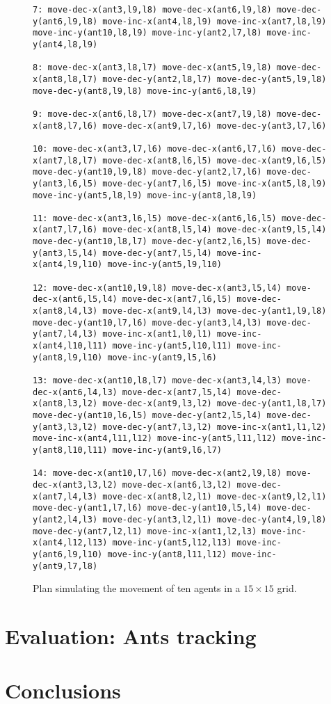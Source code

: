 \documentclass[letterpaper]{article} %
\begin{document}
\begin{figure}
\begin{scriptsize}
\begin{verbatim}
7: move-dec-x(ant3,l9,l8) move-dec-x(ant6,l9,l8) move-dec-y(ant6,l9,l8) move-inc-x(ant4,l8,l9) move-inc-x(ant7,l8,l9) move-inc-y(ant10,l8,l9) move-inc-y(ant2,l7,l8) move-inc-y(ant4,l8,l9)

8: move-dec-x(ant3,l8,l7) move-dec-x(ant5,l9,l8) move-dec-x(ant8,l8,l7) move-dec-y(ant2,l8,l7) move-dec-y(ant5,l9,l8) move-dec-y(ant8,l9,l8) move-inc-y(ant6,l8,l9)

9: move-dec-x(ant6,l8,l7) move-dec-x(ant7,l9,l8) move-dec-x(ant8,l7,l6) move-dec-x(ant9,l7,l6) move-dec-y(ant3,l7,l6)

10: move-dec-x(ant3,l7,l6) move-dec-x(ant6,l7,l6) move-dec-x(ant7,l8,l7) move-dec-x(ant8,l6,l5) move-dec-x(ant9,l6,l5) move-dec-y(ant10,l9,l8) move-dec-y(ant2,l7,l6) move-dec-y(ant3,l6,l5) move-dec-y(ant7,l6,l5) move-inc-x(ant5,l8,l9) move-inc-y(ant5,l8,l9) move-inc-y(ant8,l8,l9)

11: move-dec-x(ant3,l6,l5) move-dec-x(ant6,l6,l5) move-dec-x(ant7,l7,l6) move-dec-x(ant8,l5,l4) move-dec-x(ant9,l5,l4) move-dec-y(ant10,l8,l7) move-dec-y(ant2,l6,l5) move-dec-y(ant3,l5,l4) move-dec-y(ant7,l5,l4) move-inc-x(ant4,l9,l10) move-inc-y(ant5,l9,l10)

12: move-dec-x(ant10,l9,l8) move-dec-x(ant3,l5,l4) move-dec-x(ant6,l5,l4) move-dec-x(ant7,l6,l5) move-dec-x(ant8,l4,l3) move-dec-x(ant9,l4,l3) move-dec-y(ant1,l9,l8) move-dec-y(ant10,l7,l6) move-dec-y(ant3,l4,l3) move-dec-y(ant7,l4,l3) move-inc-x(ant1,l0,l1) move-inc-x(ant4,l10,l11) move-inc-y(ant5,l10,l11) move-inc-y(ant8,l9,l10) move-inc-y(ant9,l5,l6)

13: move-dec-x(ant10,l8,l7) move-dec-x(ant3,l4,l3) move-dec-x(ant6,l4,l3) move-dec-x(ant7,l5,l4) move-dec-x(ant8,l3,l2) move-dec-x(ant9,l3,l2) move-dec-y(ant1,l8,l7) move-dec-y(ant10,l6,l5) move-dec-y(ant2,l5,l4) move-dec-y(ant3,l3,l2) move-dec-y(ant7,l3,l2) move-inc-x(ant1,l1,l2) move-inc-x(ant4,l11,l12) move-inc-y(ant5,l11,l12) move-inc-y(ant8,l10,l11) move-inc-y(ant9,l6,l7)

14: move-dec-x(ant10,l7,l6) move-dec-x(ant2,l9,l8) move-dec-x(ant3,l3,l2) move-dec-x(ant6,l3,l2) move-dec-x(ant7,l4,l3) move-dec-x(ant8,l2,l1) move-dec-x(ant9,l2,l1) move-dec-y(ant1,l7,l6) move-dec-y(ant10,l5,l4) move-dec-y(ant2,l4,l3) move-dec-y(ant3,l2,l1) move-dec-y(ant4,l9,l8) move-dec-y(ant7,l2,l1) move-inc-x(ant1,l2,l3) move-inc-x(ant4,l12,l13) move-inc-y(ant5,l12,l13) move-inc-y(ant6,l9,l10) move-inc-y(ant8,l11,l12) move-inc-y(ant9,l7,l8)
\end{verbatim}
\end{scriptsize}
 \caption{\small Plan simulating the movement of ten agents in a $15\times 15$ grid.}
\label{fig:plan}
\end{figure}

\section{Evaluation: Ants tracking}
\label{sec:evaluation}




\section{Conclusions}
\label{sec:conclusions}



\end{document}
